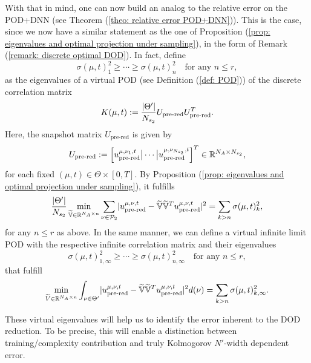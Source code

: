 With that in mind, one can now build an analog to the relative error on the
POD+DNN (see Theorem (\ref{theo: relative error POD+DNN})). This is the case, since we now have a similar statement
as the one of Proposition (\ref{prop: eigenvalues and optimal projection under sampling}), in the form
of Remark (\ref{remark: discrete optimal DOD}). In fact, define
\begin{equation} \label{eq: definition virtual eigenvalues}
    \sigma(\mu, t)_1^2 \geq \cdots \geq \sigma(\mu, t)_{n}^2 \quad \text{for any } n \leq r,
\end{equation}
as the eigenvalues of a virtual POD (see Definition (\ref{def: POD})) of the discrete correlation matrix
\begin{equation*}
    K(\mu, t) := \frac{\lvert \Theta' \rvert}{N_{s_2}} U_\text{pre-red} U_\text{pre-red}^T.
\end{equation*}
Here, the snapshot matrix $U_\text{pre-red}$ is given by
\begin{equation*}
    U_\text{pre-red} := \left[u_\text{pre-red}^{\mu, \nu_1, t} \big\vert \cdots \big\vert u_\text{pre-red}^{\mu, \nu_{N_{s_2}}, t} \right]^T 
    \in \mathbb{R}^{N_A \times N_{s_{2}}},
\end{equation*}
for each fixed $(\mu, t) \in \Theta \times [0, T]$. 
By Proposition (\ref{prop: eigenvalues and optimal projection under sampling}), it fulfills
\begin{equation*}
    \frac{\lvert \Theta' \rvert}{N_{s_2}} 
        \min\limits_{\widetilde{\mathbb{V}} \in \mathbb{R}^{N_A \times n}} 
        \sum_{\nu \in \mathcal{P}_2} 
        \lvert u_\text{pre-red}^{\mu, \nu, t} - \widetilde{\mathbb{V}} \widetilde{\mathbb{V}}^T u_\text{pre-red}^{\mu, \nu, t} \rvert^2 = \sum_{k > n} \sigma(\mu, t)^2_k,
\end{equation*}
for any $n \leq r$ as above.
In the same manner, we can define a virtual infinite limit POD with the respective infinite correlation
matrix and their eigenvalues 
\begin{equation} \label{eq: definition virtual infinity eigenvalues}
    \sigma(\mu, t)_{1, \infty}^2 \geq \cdots \geq \sigma(\mu, t)_{n, \infty}^2 \quad \text{for any } n \leq r,
\end{equation}
that fulfill 
\begin{equation*} 
        \min\limits_{\widetilde{V} \in \mathbb{R}^{N_A \times n}} 
        \int_{\nu \in \Theta'} 
        \lvert u_\text{pre-red}^{\mu, \nu, t} - \widetilde{\mathbb{V}} \widetilde{\mathbb{V}}^T u_\text{pre-red}^{\mu, \nu, t} \rvert^2 d(\nu) = \sum_{k > n} \sigma(\mu, t)^2_{k, \infty}.
\end{equation*}

These virtual eigenvalues will help us to identify the error inherent to the DOD reduction. To be precise, this
will enable a distinction between training/complexity contribution and truly Kolmogorov $N'$-width
dependent error.






